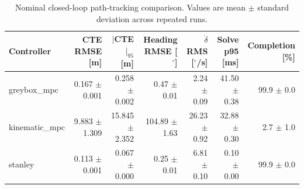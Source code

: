 \begin{table}[t]
\centering
\caption{Nominal closed-loop path-tracking comparison. Values are mean $\pm$ standard deviation across repeated runs.}
\label{tab:controller-comparison}
\begin{tabular}{lrrrrrr}
\hline
Controller & CTE RMSE [m] & $|$CTE$|_{95}$ [m] & Heading RMSE [$^\circ$] & $\dot{\delta}$ RMS [$^\circ$/s] & Solve p95 [ms] & Completion [\%] \\
\hline
greybox\_mpc & 0.167 $\pm$ 0.001 & 0.258 $\pm$ 0.002 & 0.47 $\pm$ 0.01 & 2.24 $\pm$ 0.09 & 41.50 $\pm$ 0.38 & 99.9 $\pm$ 0.0 \\
kinematic\_mpc & 9.883 $\pm$ 1.309 & 15.845 $\pm$ 2.352 & 104.89 $\pm$ 1.63 & 26.23 $\pm$ 0.92 & 32.88 $\pm$ 0.30 & 2.7 $\pm$ 1.0 \\
stanley & 0.113 $\pm$ 0.001 & 0.067 $\pm$ 0.000 & 0.25 $\pm$ 0.01 & 6.81 $\pm$ 0.10 & 0.10 $\pm$ 0.00 & 99.9 $\pm$ 0.0 \\
\hline
\end{tabular}
\end{table}
